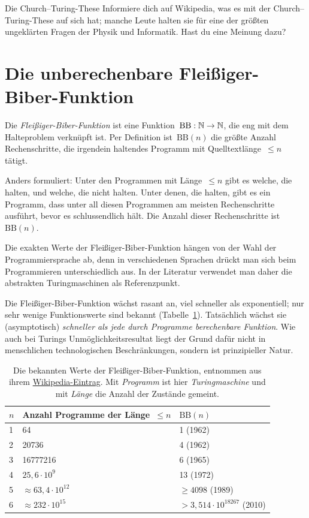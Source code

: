 \documentclass[twoside]{../zirkelblatt1415}
\theoremstyle{definition}
\theoremstyle{plain}
\theoremstyle{remark}
\newcommand{\BB}{\mathrm{BB}}
\begin{document}
\begin{aufgabe}{Die Church--Turing-These}
Informiere dich auf Wikipedia, was es mit der Church--Turing-These auf sich
hat; manche Leute halten sie für eine der größten ungeklärten Fragen der Physik
und Informatik. Hast du eine Meinung dazu?
\end{aufgabe}


\section{Die unberechenbare Fleißiger-Biber-Funktion}

Die \emph{Fleißiger-Biber-Funktion} ist eine Funktion~$\BB : \NN \to \NN$, die
eng mit dem Halteproblem verknüpft ist. Per Definition ist~$\BB(n)$ die größte
Anzahl Rechenschritte, die irgendein haltendes Programm mit
Quelltextlänge~$\leq n$ tätigt.

Anders formuliert: Unter den Programmen mit Länge~$\leq n$ gibt es welche, die
halten, und welche, die nicht halten. Unter denen, die halten, gibt es ein
Programm, dass unter all diesen Programmen am meisten Rechenschritte ausführt,
bevor es schlussendlich hält. Die Anzahl dieser Rechenschritte ist~$\BB(n)$.

Die exakten Werte der Fleißiger-Biber-Funktion hängen von der Wahl der
Programmiersprache ab, denn in verschiedenen Sprachen drückt man sich beim
Programmieren unterschiedlich aus. In der Literatur verwendet man daher die
abstrakten Turingmaschinen als Referenzpunkt.

Die Fleißiger-Biber-Funktion wächst rasant an, viel schneller als exponentiell;
nur sehr wenige Funktionswerte sind bekannt (Tabelle~\ref{tab:bb}). Tatsächlich
wächst sie (asymptotisch) \emph{schneller als jede durch Programme berechenbare
Funktion}. Wie auch bei Turings Unmöglichkeitsresultat liegt der Grund dafür
nicht in menschlichen technologischen Beschränkungen, sondern ist
prinzipieller Natur.

\begin{table}[b]
  \begin{tabular}{@{}lll@{}}
    $n$ & Anzahl Programme der Länge~$\leq n$ & $\BB(n)$ \\\midrule
    1 & 64 & 1 (1962) \\
    2 & 20736 & 4 (1962) \\
    3 & 16777216 & 6 (1965) \\
    4 & $25{,}6 \cdot 10^9$ & 13 (1972) \\
    5 & $\approx 63{,}4 \cdot 10^{12}$ & $\geq 4098$ (1989) \\
    6 & $\approx 232 \cdot 10^{15}$ & $> 3{,}514 \cdot 10^{18267}$ (2010) \\
  \end{tabular}
  \centering
  \caption{\label{tab:bb}Die bekannten Werte der Fleißiger-Biber-Funktion,
  entnommen aus ihrem
  \href{http://de.wikipedia.org/wiki/Fleißiger_Biber}{Wikipedia-Eintrag}. Mit
  \emph{Programm} ist hier \emph{Turingmaschine} und mit \emph{Länge}
  die Anzahl der Zustände gemeint.}
\end{table}
\end{document}
